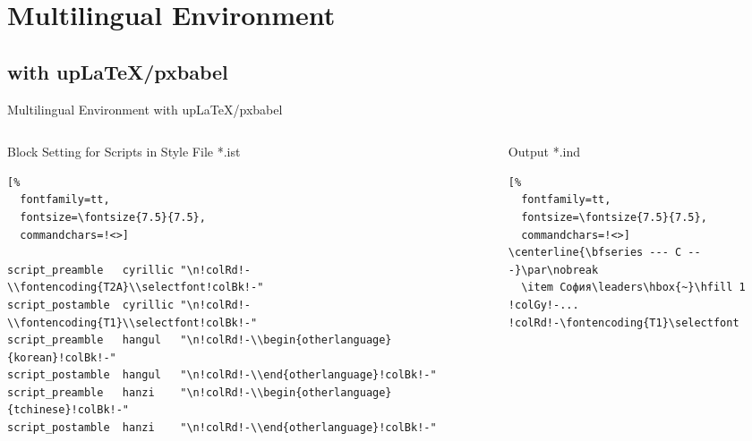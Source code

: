 \documentclass[aspectratio=169,10pt]{beamer}
\begin{document}

\section{Multilingual Environment}
\subsection{with upLaTeX/pxbabel}

\setmonofont{Noto Sans Mono CJK JP}
\begin{frame}[fragile]{Multilingual Environment with upLaTeX/pxbabel}
\begin{columns}
\begin{column}{84mm}
\begin{exampleblock}{Block Setting for Scripts in Style File *.ist}
\makeatletter
\def\verbatim@font{\fontsize{7.5}{7.5}\selectfont\textjapanese}
\makeatother
\begin{Verbatim}[%
  fontfamily=tt,
  fontsize=\fontsize{7.5}{7.5},
  commandchars=!<>]

script_preamble   cyrillic "\n!colRd!-\\fontencoding{T2A}\\selectfont!colBk!-"
script_postamble  cyrillic "\n!colRd!-\\fontencoding{T1}\\selectfont!colBk!-"
script_preamble   hangul   "\n!colRd!-\\begin{otherlanguage}{korean}!colBk!-"
script_postamble  hangul   "\n!colRd!-\\end{otherlanguage}!colBk!-"
script_preamble   hanzi    "\n!colRd!-\\begin{otherlanguage}{tchinese}!colBk!-"
script_postamble  hanzi    "\n!colRd!-\\end{otherlanguage}!colBk!-"

\end{Verbatim}
\end{exampleblock}
\end{column}
\begin{column}{60mm}
\begin{exampleblock}{Output *.ind}
\begin{Verbatim}[%
  fontfamily=tt,
  fontsize=\fontsize{7.5}{7.5},
  commandchars=!<>]
\centerline{\bfseries --- С ---}\par\nobreak
  \item София\leaders\hbox{~}\hfill 1
!colGy!-...
!colRd!-\fontencoding{T1}\selectfont


\end{Verbatim}
\end{exampleblock}
\end{column}
\end{columns}
\end{frame}
\end{document}
